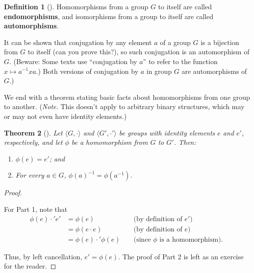\documentclass[10pt,]{book}
\newcommand{\terminology}[1]{\textbf{#1}}
\theoremstyle{plain}
\newtheorem{theorem}{Theorem}[section]
\theoremstyle{definition}
\newtheorem{definition}[theorem]{Definition}
\theoremstyle{definition}
\theoremstyle{definition}
\theoremstyle{definition}
\numberwithin{equation}{section}
\newcommand{\amp}{&}
\begin{document}
\begin{definition}[{}]\label{definition-33}
Homomorphisms from a group \(G\) to itself are called \terminology{endomorphisms}, and isomorphisms from a group to itself are called \terminology{automorphisms}.%
\end{definition}
It can be shown that conjugation by any element \(a\) of a group \(G\) is a bijection from \(G\) to itself (can you prove this?), so such conjugation is an automorphism of \(G\). (Beware: Some texts use ``conjugation by \(a\)'' to refer to the function \(x\mapsto a^{-1}xa\).) Both versions of conjugation by \(a\) in group \(G\) are automorphisms of \(G\).)%
\par
We end with a theorem stating basic facts about homomorphisms from one group to another. (\emph{Note.} This doesn't apply to arbitrary binary structures, which may or may not even have identity elements.)%
\begin{theorem}[{}]\label{homoprops}
Let \(\langle G,\cdot\rangle\) and \(\langle G',\cdot'\rangle\) be groups with identity elements \(e\) and \(e'\), respectively, and let \(\phi\) be a homomorphism from \(G\) to \(G'\). Then: \leavevmode%
\begin{enumerate}
\item\hypertarget{li-143}{}\(\phi(e)=e'\); and%
\item\hypertarget{li-144}{}For every \(a\in G\), \(\phi(a)^{-1}=\phi(a^{-1})\).%
\end{enumerate}
%
\end{theorem}
\begin{proof}\hypertarget{proof-16}{}
For Part 1, note that%
\begin{align*}
\phi(e)\cdot'e'\amp =\phi(e)\amp \amp \text{ (by definition of \(e'\)) }\\
\amp =\phi(e\cdot e) \amp \amp \text{ (by definition of \(e\)) }\\
\amp =\phi(e)\cdot'\phi(e) \amp \amp \text{ (since \(\phi\) is a homomorphism). }
\end{align*}
%
\par
Thus, by left cancellation, \(e'=\phi(e)\). The proof of Part 2 is left as an exercise for the reader.%
\end{proof}
\typeout{************************************************}
\typeout{************************************************}
\end{document}
